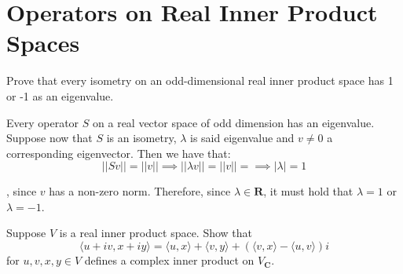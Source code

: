 \section{Operators on Real Inner Product Spaces}

\begin{exercise}{2}
    Prove that every isometry on an odd-dimensional real inner product space has 1 or -1 as an eigenvalue.
\end{exercise}

\begin{solution}
    
    Every operator $S$ on a real vector space of odd dimension has an eigenvalue. Suppose now that $S$ is an isometry, $\lambda$ is said eigenvalue and $v \neq 0$ a corresponding eigenvector. Then we have that:
    $$\lvert \lvert Sv \rvert \rvert = \lvert \lvert v \rvert \rvert \implies \lvert \lvert \lambda v \rvert \rvert = \lvert \lvert v \rvert \rvert =\implies \lvert \lambda \rvert = 1$$

    , since $v$ has a non-zero norm. Therefore, since $\lambda \in \mathbf{R}$, it must hold that $\lambda = 1$ or $\lambda = -1$.
\end{solution}

\begin{exercise}{3}
    Suppose $V$ is a real inner product space. Show that
    $$\langle u + iv, x + iy \rangle = \langle u, x \rangle + \langle v, y \rangle + (\langle v, x \rangle - \langle u, v \rangle)i$$
    for $u, v, x, y \in V$ defines a complex inner product on $V_\mathbf{C}$.
\end{exercise}

